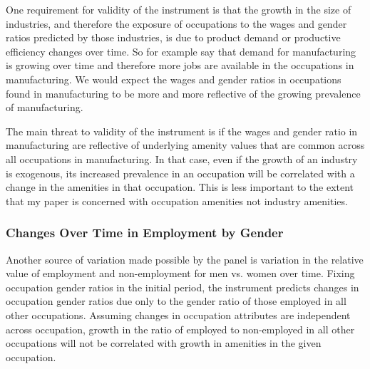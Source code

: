 \documentclass[12pt]{article}
\begin{document}
One requirement for validity of the instrument is that the growth in the size of industries, and therefore the exposure of occupations to the wages and gender ratios predicted by those industries, is due to product demand or productive efficiency changes over time. So for example say that demand for manufacturing is growing over time and therefore more jobs are available in the occupations in manufacturing. We would expect the wages and gender ratios in occupations found in manufacturing to be more and more reflective of the growing prevalence of manufacturing.

The main threat to validity of the instrument is if the wages and gender ratio in manufacturing are reflective of underlying amenity values that are common across all occupations in manufacturing. In that case, even if the growth of an industry is exogenous, its increased prevalence in an occupation will be correlated with a change in the amenities in that occupation. This is less important to the extent that my paper is concerned with occupation amenities not industry amenities.






\subsubsection{Changes Over Time in Employment by Gender}
Another source of variation made possible by the panel is variation in the relative value of employment and non-employment for men vs. women over time. Fixing occupation gender ratios in the initial period, the instrument predicts changes in occupation gender ratios due only to the gender ratio of those employed in all other occupations. Assuming changes in occupation attributes are independent across occupation, growth in the ratio of employed to non-employed in all other occupations will not be correlated with growth in amenities in the given occupation. 
\end{document}
